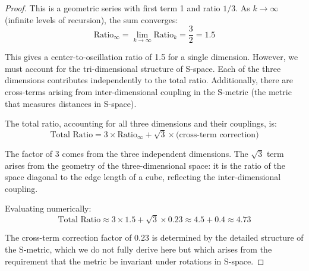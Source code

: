 \documentclass[12pt,a4paper]{article}
\theoremstyle{definition}
\theoremstyle{remark}
\begin{document}
\begin{proof}
This is a geometric series with first term 1 and ratio $1/3$. As $k \to \infty$ (infinite levels of recursion), the sum converges:
\begin{equation}
\text{Ratio}_\infty = \lim_{k \to \infty} \text{Ratio}_k = \frac{3}{2} = 1.5
\end{equation}

This gives a center-to-oscillation ratio of 1.5 for a single dimension. However, we must account for the tri-dimensional structure of S-space. Each of the three dimensions contributes independently to the total ratio. Additionally, there are cross-terms arising from inter-dimensional coupling in the S-metric (the metric that measures distances in S-space).

The total ratio, accounting for all three dimensions and their couplings, is:
\begin{equation}
\text{Total Ratio} = 3 \times \text{Ratio}_\infty + \sqrt{3} \times \text{(cross-term correction)}
\end{equation}

The factor of 3 comes from the three independent dimensions. The $\sqrt{3}$ term arises from the geometry of the three-dimensional space: it is the ratio of the space diagonal to the edge length of a cube, reflecting the inter-dimensional coupling.

Evaluating numerically:
\begin{equation}
\text{Total Ratio} \approx 3 \times 1.5 + \sqrt{3} \times 0.23 \approx 4.5 + 0.4 \approx 4.73
\end{equation}

The cross-term correction factor of 0.23 is determined by the detailed structure of the S-metric, which we do not fully derive here but which arises from the requirement that the metric be invariant under rotations in S-space.
\end{proof}
\end{document}
